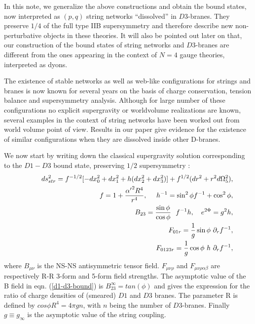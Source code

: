 \documentclass[a4paper,12pt]{article}
\begin{document}
In this note, we generalize the above constructions and obtain the 
bound states, now interpreted as 
$(p, q)$ string networks \cite{sen,sandip} ``dissolved'' 
in $D3$-branes. They preserve $1/4$ of the full type IIB supersymmetry and 
therefore describe new non-perturbative objects in these theories. 
It will also be pointed out later on that, our construction 
of the bound states of string networks and $D3$-branes 
are different from the ones appearing in the context of 
$N=4$ gauge theories, interpreted as dyons\cite{bergman,hata,hashi}. 

The existence of stable 
networks as well as web-like configurations for strings and branes is
now known for several years \cite{schwarz2} on the
basis of charge conservation, tension balance and supersymmetry analysis.
Although for large number of these configurations no explicit supergravity
or worldvolume realizations are  known,  
several examples in the context of string networks have been 
worked out from world volume point of view\cite{dasg,hata}.
Results in our paper give evidence for the existence of similar
configurations when they are dissolved inside other D-branes.  
 

We now start by writing down the classical 
supergravity solution \cite{malda-russo}
corresponding to the $D1-D3$ bound state\cite{myers,costa}, 
preserving ${1/2}$ supersymmetry :
\begin{eqnarray}
&&ds^2_{str} = f^{-1/2} [ - dx_0^2 + dx_1^2 +{h}(dx_2^2 + dx_3^2 )]
+ f^{1/2} ( dr^2 + r^2 d \Omega^2_5 ), \nonumber\\
&&f = 1 + {{\alpha'}^2 R^4\over r^4} ,\
~~~h^{-1} =\sin^2\phi f^{-1}+\cos^2\phi, \nonumber\\
&&B_{23} ={\sin\phi\over \cos\phi }\ \ f^{-1} h, 
~~~e^{2\Phi} = g^2 h, \nonumber\\
&&F_{01r} = {1 \over g} \sin\phi\ \partial_r f^{-1}, \nonumber\\
\ \ \ \ \
&&F_{0123r} = {1 \over g} \cos\phi \ h \ \partial_r f^{-1},
\label{d1-d3-bound}
\end{eqnarray}
where $B_{\mu \nu}$ is the NS-NS antisymmetric tensor field. 
$F_{\mu \nu \rho}$ and $F_{\mu \nu \rho \alpha \beta}$ are 
respectively R-R 3-form and 5-form field strengths. 
The asymptotic value of the B field in eqn. (\ref{d1-d3-bound})
is $B_{23}^{\infty} = tan(\phi)$ and gives the 
expression for the ratio of charge densities of 
(smeared) $D1$ and $D3$ branes. 
The parameter R is defined by $cos \phi R^4 = 4\pi g n$,
with $n$ being the number of $D3$-branes. Finally $g \equiv g_{\infty}$ is
the asymptotic value of the string coupling. 
\end{document}
